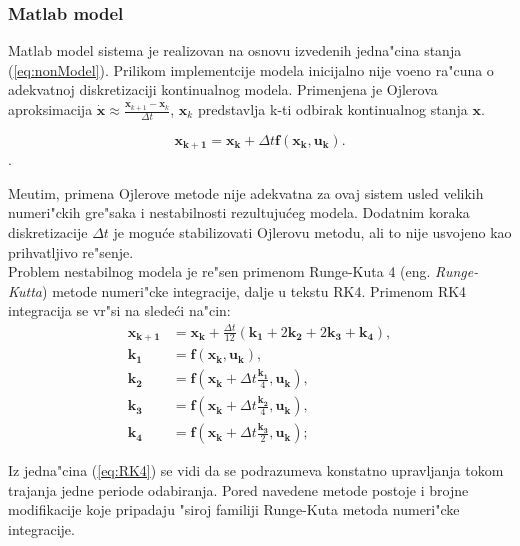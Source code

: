 \documentclass[a4paper,11pt]{article}
\theoremstyle{definition} \newtheorem{deff}{Definicija}[section]
\theoremstyle{definition} \newtheorem{prim}[deff]{Primer}
\theoremstyle{plain} \newtheorem{teor}[deff]{Teorema}
\newcommand{\vect}[1]{\boldsymbol{\mathbf{#1}}}
\begin{document}
	
	
	\clearpage
	
	\subsubsection{Matlab model}\label{sec:matlab_model}
	
	Matlab model sistema je realizovan na osnovu izvedenih jedna"cina stanja (\ref{eq:nonModel}). Prilikom implementcije modela inicijalno nije vo\dj eno ra"cuna o adekvatnoj diskretizaciji kontinualnog modela. Primenjena je Ojlerova aproksimacija $\dot{\mathbf{x}} \approx \frac{\mathbf{x}_{k+1} - \mathbf{x}_{k}}{\Delta t}$, $\mathbf{x}_{k}$ predstavlja k-ti odbirak kontinualnog stanja $\mathbf{x}$.
	
	\begin{equation} \label{eq:Ojler}
		\vect{x_{k+1}} = \vect{x_{k}} + \Delta t \vect{f}(\vect{x_k}, \vect{u_k}).
	\end{equation}.
	
	Me\dj utim, primena Ojlerove metode nije adekvatna za ovaj sistem usled velikih numeri"ckih gre"saka i nestabilnosti rezultuju\'ceg modela. Dodatnim koraka diskretizacije $\Delta t$ je mogu\'ce stabilizovati Ojlerovu metodu, ali to nije usvojeno kao prihvatljivo re"senje.\\
	
	Problem nestabilnog modela je re"sen primenom Runge-Kuta 4 (eng. \textit{Runge-Kutta}) metode numeri"cke integracije, dalje u tekstu RK4. Primenom RK4 integracija se vr"si na slede\'ci na"cin: 
	\begin{align} \label{eq:RK4}
		\vect{x_{k+1}} &= \vect{x_k} + \frac{\Delta t}{12}(\vect{k_1} + 2\vect{k_2}
			+ 2\vect{k_3} + \vect{k_4}), \\			
		\vect{k_1} &= \vect{f}(\vect{x_k}, \vect{u_k}), \\
		\vect{k_2} &= \vect{f}(\vect{x_k} + \Delta t \frac{\vect{k_1}}{4}, \vect{u_k}), \\
		\vect{k_3} &= \vect{f}(\vect{x_k} + \Delta t \frac{\vect{k_2}}{4}, \vect{u_k}), \\
		\vect{k_4} &= \vect{f}(\vect{x_k} +  \Delta t \frac{\vect{k_3}}{2}, \vect{u_k});		
	\end{align}
	
	Iz jedna"cina (\ref{eq:RK4}) se vidi da se podrazumeva konstatno upravljanja tokom trajanja jedne periode odabiranja. Pored navedene metode postoje i brojne modifikacije koje pripadaju "siroj familiji Runge-Kuta metoda numeri"cke integracije. \\
	
\end{document}
